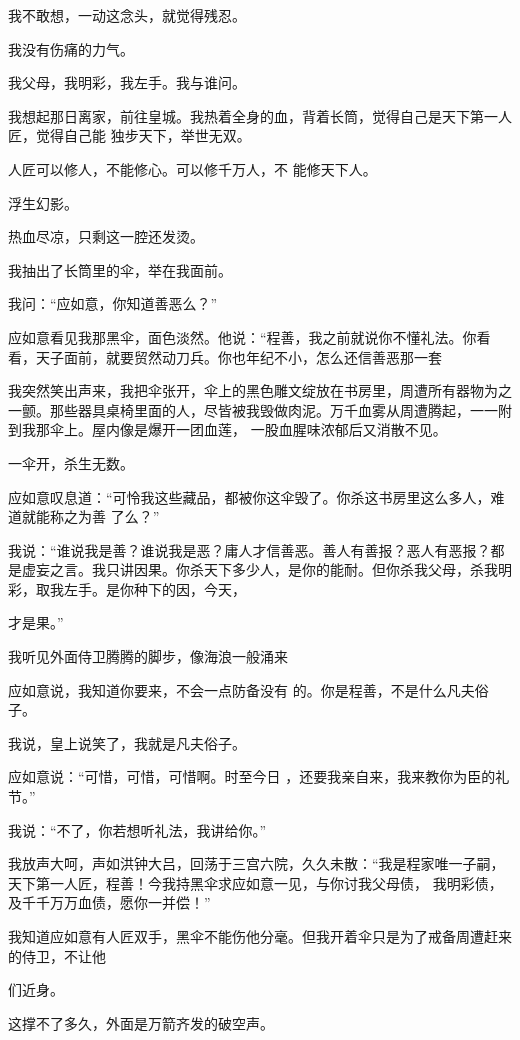 \documentclass{article}
\begin{document}
我不敢想，一动这念头，就觉得残忍。 


我没有伤痛的力气。 


我父母，我明彩，我左手。我与谁问。 

我想起那日离家，前往皇城。我热着全身的血，背着长筒，觉得自己是天下第一人匠，觉得自己能
独步天下，举世无双。 

人匠可以修人，不能修心。可以修千万人，不
能修天下人。 


浮生幻影。 


热血尽凉，只剩这一腔还发烫。 


我抽出了长筒里的伞，举在我面前。 


\newpage

我问：“应如意，你知道善恶么？” 

应如意看见我那黑伞，面色淡然。他说：“程善，我之前就说你不懂礼法。你看看，天子面前，就要贸然动刀兵。你也年纪不小，怎么还信善恶那一套

我突然笑出声来，我把伞张开，伞上的黑色雕文绽放在书房里，周遭所有器物为之一颤。那些器具桌椅里面的人，尽皆被我毁做肉泥。万千血雾从周遭腾起，一一附到我那伞上。屋内像是爆开一团血莲，
一股血腥味浓郁后又消散不见。 


一伞开，杀生无数。 

应如意叹息道：“可怜我这些藏品，都被你这伞毁了。你杀这书房里这么多人，难道就能称之为善
了么？” 

我说：“谁说我是善？谁说我是恶？庸人才信善恶。善人有善报？恶人有恶报？都是虚妄之言。我只讲因果。你杀天下多少人，是你的能耐。但你杀我父母，杀我明彩，取我左手。是你种下的因，今天，
\newpage

才是果。” 

我听见外面侍卫腾腾的脚步，像海浪一般涌来

应如意说，我知道你要来，不会一点防备没有
的。你是程善，不是什么凡夫俗子。 


我说，皇上说笑了，我就是凡夫俗子。 

应如意说：“可惜，可惜，可惜啊。时至今日
，还要我亲自来，我来教你为臣的礼节。” 

我说：“不了，你若想听礼法，我讲给你。”

我放声大呵，声如洪钟大吕，回荡于三宫六院，久久未散：“我是程家唯一子嗣，天下第一人匠，程善！今我持黑伞求应如意一见，与你讨我父母债，
我明彩债，及千千万万血债，愿你一并偿！” 

我知道应如意有人匠双手，黑伞不能伤他分毫。但我开着伞只是为了戒备周遭赶来的侍卫，不让他
\newpage

们近身。 


这撑不了多久，外面是万箭齐发的破空声。 
\end{document}
